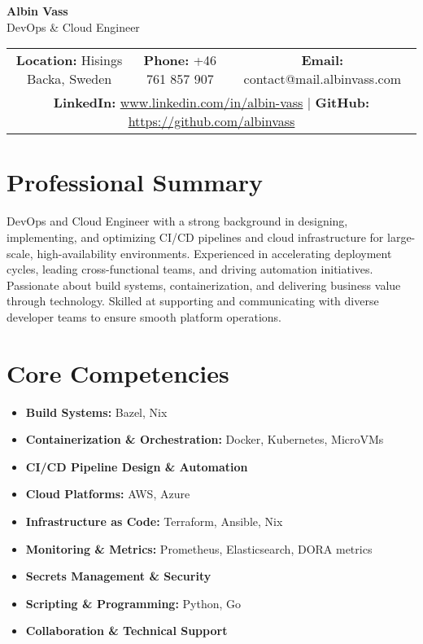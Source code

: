 \documentclass[11pt,a4paper]{article}
\begin{document}
\begin{center}
    {\huge\bfseries\color{darkblue} Albin Vass} \\
    \vspace{0.5em}
    {\Large DevOps \& Cloud Engineer} \\
    \vspace{1em}
    \begin{tabular}{c c c}
        \textbf{Location:} Hisings Backa, Sweden & 
        \textbf{Phone:} +46 761 857 907 & 
        \textbf{Email:} contact@mail.albinvass.com \\
        \multicolumn{3}{c}{\textbf{LinkedIn:} \href{http://www.linkedin.com/in/albin-vass}{www.linkedin.com/in/albin-vass} | \textbf{GitHub:} \href{https://github.com/albinvass}{https://github.com/albinvass}}
    \end{tabular}
\end{center}

\vspace{1em}

\section{Professional Summary}
DevOps and Cloud Engineer with a strong background in designing, implementing, and optimizing CI/CD pipelines and cloud infrastructure for large-scale, high-availability environments. Experienced in accelerating deployment cycles, leading cross-functional teams, and driving automation initiatives. Passionate about build systems, containerization, and delivering business value through technology. Skilled at supporting and communicating with diverse developer teams to ensure smooth platform operations.

\section{Core Competencies}
\begin{itemize}[leftmargin=*]
    \item \textbf{Build Systems:} Bazel, Nix
    \item \textbf{Containerization \& Orchestration:} Docker, Kubernetes, MicroVMs
    \item \textbf{CI/CD Pipeline Design \& Automation}
    \item \textbf{Cloud Platforms:} AWS, Azure
    \item \textbf{Infrastructure as Code:} Terraform, Ansible, Nix
    \item \textbf{Monitoring \& Metrics:} Prometheus, Elasticsearch, DORA metrics
    \item \textbf{Secrets Management \& Security}
    \item \textbf{Scripting \& Programming:} Python, Go
    \item \textbf{Collaboration \& Technical Support}
\end{itemize}
\end{document}

